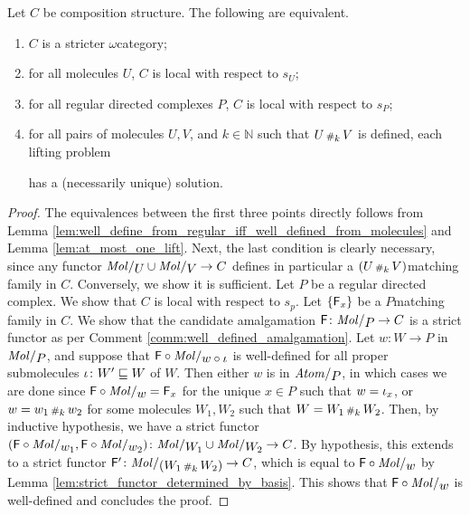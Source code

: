 \begin{lem} \label{lem:stricter_iff_local_wrt_pasting}
    Let \( C \) be composition structure.
    The following are equivalent.
    \begin{enumerate}
        \item \( C \) is a stricter \( \omega \)\nbd category;
        \item for all molecules \( U \), \( C \) is local with respect to \( s_U \);
        \item for all regular directed complexes \( P \), \( C \) is local with respect to \( s_P \);
        \item for all pairs of molecules \( U, V \), and \( k \in \mathbb{N} \) such that \( U \,{\scriptstyle\#}_{k}\, V \) is defined, each lifting problem
        \begin{center}
        \end{center}
        has a (necessarily unique) solution.
    \end{enumerate}
\end{lem}
\begin{proof}
    The equivalences between the first three points directly follows from Lemma \ref{lem:well_define_from_regular_iff_well_defined_from_molecules} and Lemma \ref{lem:at_most_one_lift}.
    Next, the last condition is clearly necessary, since any functor \( \molecin{U} \cup \molecin{V} \to C \) defines in particular a \( (U \,{\scriptstyle\#}_{k}\, V) \)\nbd matching family in \( C \).
    Conversely, we show it is sufficient.
    Let \( P \) be a regular directed complex.
    We show that \( C \) is local with respect to \( s_p \).
    Let \( \left\{ {\mathsf{F}_x} \right\} \) be a \( P \)\nbd matching family in \( C \).
    We show that the candidate amalgamation \( \F \colon \molecin{P} \to C \) is a strict functor as per Comment \ref{comm:well_defined_amalgamation}.
    Let \( w \colon W \to P \) in \( \molecin{P} \), and suppose that \( \F \after \molecin{w \after \iota} \) is well-defined for all proper submolecules \( \iota \colon W' \sqsubseteq W \) of \( W \).
    Then either \( w \) is in \( \atomin{P} \), in which cases we are done since \( \F \after \molecin{w} = \F_x \) for the unique \( x \in P \) such that \( w = \iota_{x} \), or \( w = w_1 \,{\scriptstyle\#}_{k}\, w_2 \) for some molecules \( W_1, W_2 \) such that \( W = W_1 \,{\scriptstyle\#}_{k}\, W_2 \).
    Then, by inductive hypothesis, we have a strict functor \( (\F \after \molecin{w_1}, \F \after \molecin{w_2}) \colon \molecin{W_1} \cup \molecin{W_2} \to C \).
    By hypothesis, this extends to a strict functor \( \F' \colon \molecin{(W_1 \cp{k} W_2)} \to C \), which is equal to \( \F \after \molecin{w} \) by Lemma \ref{lem:strict_functor_determined_by_basis}.
    This shows that \( \F \after \molecin{w} \) is well-defined and concludes the proof.
\end{proof}


